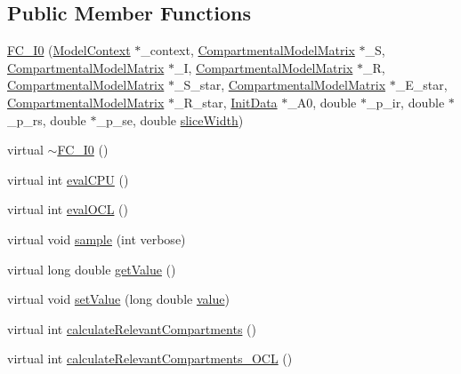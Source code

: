\subsection*{Public Member Functions}
\begin{DoxyCompactItemize}
\item 
\hyperlink{classSpatialSEIR_1_1FC__I0_a3b6918878122f5499f9daa03732580e0}{F\-C\-\_\-\-I0} (\hyperlink{classSpatialSEIR_1_1ModelContext}{Model\-Context} $\ast$\-\_\-context, \hyperlink{classSpatialSEIR_1_1CompartmentalModelMatrix}{Compartmental\-Model\-Matrix} $\ast$\-\_\-\-S, \hyperlink{classSpatialSEIR_1_1CompartmentalModelMatrix}{Compartmental\-Model\-Matrix} $\ast$\-\_\-\-I, \hyperlink{classSpatialSEIR_1_1CompartmentalModelMatrix}{Compartmental\-Model\-Matrix} $\ast$\-\_\-\-R, \hyperlink{classSpatialSEIR_1_1CompartmentalModelMatrix}{Compartmental\-Model\-Matrix} $\ast$\-\_\-\-S\-\_\-star, \hyperlink{classSpatialSEIR_1_1CompartmentalModelMatrix}{Compartmental\-Model\-Matrix} $\ast$\-\_\-\-E\-\_\-star, \hyperlink{classSpatialSEIR_1_1CompartmentalModelMatrix}{Compartmental\-Model\-Matrix} $\ast$\-\_\-\-R\-\_\-star, \hyperlink{classSpatialSEIR_1_1InitData}{Init\-Data} $\ast$\-\_\-\-A0, double $\ast$\-\_\-p\-\_\-ir, double $\ast$\-\_\-p\-\_\-rs, double $\ast$\-\_\-p\-\_\-se, double \hyperlink{classSpatialSEIR_1_1FullConditional_a150ee031af8d086ad0a04b13630a110f}{slice\-Width})
\item 
virtual \hyperlink{classSpatialSEIR_1_1FC__I0_a2260d07e48a7d7b5dab19ee22e365b38}{$\sim$\-F\-C\-\_\-\-I0} ()
\item 
virtual int \hyperlink{classSpatialSEIR_1_1FC__I0_a36dbaf498cb226c7b2042438f9432ae4}{eval\-C\-P\-U} ()
\item 
virtual int \hyperlink{classSpatialSEIR_1_1FC__I0_abc02f4b767cda97f040e53095dd3024d}{eval\-O\-C\-L} ()
\item 
virtual void \hyperlink{classSpatialSEIR_1_1FC__I0_af87aa3379ff282e36478301ff271ba40}{sample} (int verbose)
\item 
virtual long double \hyperlink{classSpatialSEIR_1_1FC__I0_a69f4e641113c47ae2e28dbd44f8c8261}{get\-Value} ()
\item 
virtual void \hyperlink{classSpatialSEIR_1_1FC__I0_ae5db486bbdcdf2900278a17aea761e7a}{set\-Value} (long double \hyperlink{classSpatialSEIR_1_1FC__I0_a81955b1dfdaf09a58122944420b40750}{value})
\item 
virtual int \hyperlink{classSpatialSEIR_1_1FC__I0_aa463dde280304445e22a9653536a1edb}{calculate\-Relevant\-Compartments} ()
\item 
virtual int \hyperlink{classSpatialSEIR_1_1FC__I0_ab1d7728b636f695a984ce609de87efde}{calculate\-Relevant\-Compartments\-\_\-\-O\-C\-L} ()
\end{DoxyCompactItemize}

